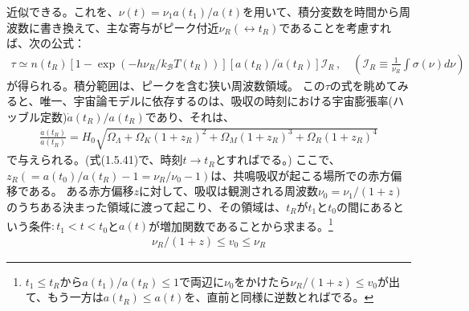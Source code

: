 \documentclass[11pt]{ltjsarticle}
\theoremstyle{plain}
\theoremstyle{break}
\begin{document}
近似できる。これを、$\nu(t) = \nu_{1} a(t_1) / a(t)$を用いて、積分変数を時間から周波数に書き換えて、主な寄与がピーク付近$\nu_{R} ( \leftrightarrow t_{R})$であることを考慮すれば、次の公式：
\begin{align}
  \tau \simeq n\left(t_{R}\right)\left[1-\exp \left(-h \nu_{R} / k_{\mathcal{B}} T\left(t_{R}\right)\right)\right]\left[a\left(t_{R}\right) / \dot{a}\left(t_{R}\right)\right] \mathcal{I}_{R}  \,,\quad  (\mathcal{I}_{R} \equiv \frac{1}{\nu_{R}} \int \sigma(\nu) d \nu) \label{eq:1.10.6}
\end{align}%
が得られる。積分範囲は、ピークを含む狭い周波数領域。
この$\tau$の式を眺めてみると、唯一、宇宙論モデルに依存するのは、吸収の時刻における宇宙膨張率(ハッブル定数)$\dot{a}(t_R) / a(t_R)$であり、それは、
\begin{align}
  \frac{\dot{a}\left(t_{R}\right)}{a\left(t_{R}\right)}=H_{0} \sqrt{\Omega_{\Lambda}+\Omega_{K}\left(1+z_{R}\right)^{2}+\Omega_{M}\left(1+z_{R}\right)^{3}+\Omega_{R}\left(1+z_{R}\right)^{4}}
\end{align}%
で与えられる。(式(1.5.41)で、時刻$t \rightarrow t_R$とすればでる。)
ここで、$z_{R} (=a\left(t_{0}\right) / a\left(t_{R}\right)-1=\nu_{R} / \nu_{0}-1)$は、共鳴吸収が起こる場所での赤方偏移である。
ある赤方偏移$z$に対して、吸収は観測される周波数$\nu_0 = \nu_1/(1+z)$のうちある決まった領域に渡って起こり、その領域は、$t_R$が$t_1$と$t_0$の間にあるという条件$:t_1<t<t_0$と$a(t)$が増加関数であることから求まる。\footnote{$t_1 \leq t_R$から$a(t_1)/a(t_R) \leq 1$で両辺に$\nu_0$をかけたら$\nu_{R} /(1+z) \leq v_{0} $が出て、もう一方は$a(t_R) \leq a(t)$を、直前と同様に逆数とればでる。}
\begin{align}
  \nu_{R} /(1+z) \leq v_{0} \leq \nu_{R} \label{eq:1.10.9}
\end{align}%
\end{document}
